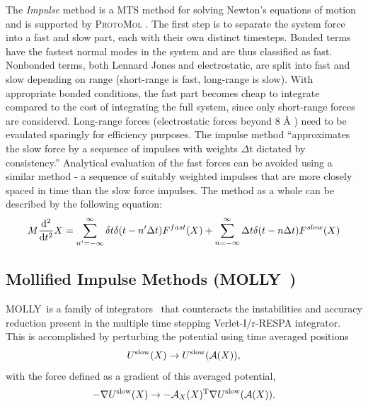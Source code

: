 \documentclass[11pt]{report}
\newcommand{\ProtoMol}{\textsc{ProtoMol }}
\newcommand{\MOLLY}{\textsc{MOLLY\ }}
\begin{document}
\begin{appendix}
The {\it Impulse} method is a MTS method for solving Newton's
equations of motion and is supported by \ProtoMol.  The first step is
to separate the system force into a fast and slow part, each with
their own distinct timesteps.  Bonded terms have the fastest normal
modes in the system and are thus classified as fast.  Nonbonded terms,
both Lennard Jones and electrostatic, are split into fast and slow
depending on range (short-range is fast, long-range is slow).  With
appropriate bonded conditions, the fast part becomes cheap to
integrate compared to the cost of integrating the full system, since
only short-range forces are considered.  Long-range forces
(electrostatic forces beyond 8 \AA{ }) need to be evaulated sparingly
for efficiency purposes.  The impulse method ``approximates the slow
force by a sequence of impulses with weights {\begin{math} \Delta
\end{math}}t dictated by consistency.''   Analytical evaluation of the
fast forces can be avoided using a similar method - a sequence of
suitably weighted impulses that are more closely spaced in time than
the slow force impulses.  The method as a whole can be described by
the following equation: \\

\begin{equation}
M \frac{{\mathrm{d}}^2} {\mathrm{d} t^2} X = \sum_{n'=-\infty}^{\infty} \delta t {\bf \delta} (t - n'\Delta t) {F}^{fast} (X) + \sum_{n=-\infty}^{\infty} \Delta t {\bf \delta}(t - n\Delta t) {F}^{slow} (X)
\end{equation}


\subsection{Mollified Impulse Methods (\MOLLY) ~\cite{Izag99}}

\MOLLY is a family of integrators~\cite{GaSS98b} that counteracts the
instabilities and accuracy reduction present in the multiple time
stepping Verlet-I/r-RESPA 
integrator. This is accomplished by perturbing the potential using
time averaged positions
\begin{equation}
U^{{\rm slow}}(X)\rightarrow U^{{\rm slow}}({\mathcal{A}}(X)),
\end{equation}
with the force defined as a gradient of this averaged potential, 
\begin{equation}
-\nabla U^{{\rm slow}}(X)\rightarrow -{\mathcal A}_{X}(X)^{{\rm T}}\nabla U^{
{\rm slow}}({\mathcal A}(X)).
\end{equation}


\end{appendix}
\end{document}
